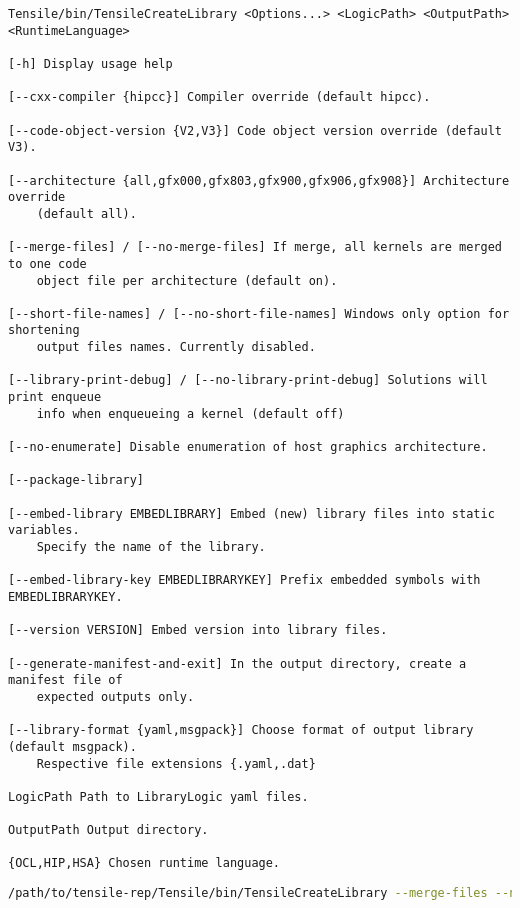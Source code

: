 \documentclass[]{article}
\begin{document}
\begin{lstlisting}
Tensile/bin/TensileCreateLibrary <Options...> <LogicPath> <OutputPath> <RuntimeLanguage>

[-h] Display usage help

[--cxx-compiler {hipcc}] Compiler override (default hipcc).

[--code-object-version {V2,V3}] Code object version override (default V3).

[--architecture {all,gfx000,gfx803,gfx900,gfx906,gfx908}] Architecture override
    (default all).

[--merge-files] / [--no-merge-files] If merge, all kernels are merged to one code
    object file per architecture (default on).

[--short-file-names] / [--no-short-file-names] Windows only option for shortening
    output files names. Currently disabled.

[--library-print-debug] / [--no-library-print-debug] Solutions will print enqueue
    info when enqueueing a kernel (default off)

[--no-enumerate] Disable enumeration of host graphics architecture.

[--package-library]

[--embed-library EMBEDLIBRARY] Embed (new) library files into static variables.
    Specify the name of the library.

[--embed-library-key EMBEDLIBRARYKEY] Prefix embedded symbols with EMBEDLIBRARYKEY.

[--version VERSION] Embed version into library files.

[--generate-manifest-and-exit] In the output directory, create a manifest file of
    expected outputs only.

[--library-format {yaml,msgpack}] Choose format of output library (default msgpack).
    Respective file extensions {.yaml,.dat}

LogicPath Path to LibraryLogic yaml files.

OutputPath Output directory.

{OCL,HIP,HSA} Chosen runtime language.
\end{lstlisting}

\begin{lstlisting}[language=bash]
/path/to/tensile-rep/Tensile/bin/TensileCreateLibrary --merge-files --no-short-file-names --no-library-print-debug --code-object-version=V3 --cxx-compiler=hipcc --library-format=msgpack path/to/new/logic path/to/drop/new/tensile HIP
\end{lstlisting}
\end{document}

